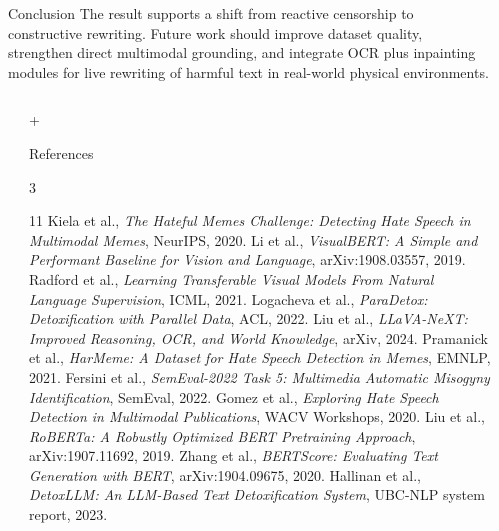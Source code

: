 \documentclass[final]{beamer}
\newlength{\sepwidth}
\newlength{\colwidth}
\newcommand{\separatorcolumn}{\begin{column}{\sepwidth}\end{column}}
\newcommand{\smallgap}{\vspace{0.18em}}
\begin{document}
\begin{frame}[t]
\begin{columns}[t]
\begin{column}{\colwidth}
\begin{block}{Conclusion}
    \smallgap
    The result supports a shift from reactive censorship to constructive
    rewriting. Future work should improve dataset quality, strengthen direct
    multimodal grounding, and integrate OCR plus inpainting modules for live
    rewriting of harmful text in real-world physical
    environments.
    \end{block}

\end{column}
\separatorcolumn

\end{columns}

\vspace{-0.2em}
\begin{columns}[t]
\separatorcolumn
\begin{column}{\colwidth+\sepwidth\relax}
    \begin{block}{References}
    \vspace{-0.7em}
    \begin{multicols}{3}
    \setlength{\columnsep}{3.0cm}
    \raggedcolumns
    \tiny{}
    \begin{thebibliography}{11}
        \setlength{\itemsep}{0pt}
        \setlength{\parskip}{0pt}
        \setlength{\parsep}{0pt}
         Kiela et al., \emph{The Hateful Memes Challenge: Detecting Hate Speech in Multimodal Memes}, NeurIPS, 2020.
         Li et al., \emph{VisualBERT: A Simple and Performant Baseline for Vision and Language}, arXiv:1908.03557, 2019.
         Radford et al., \emph{Learning Transferable Visual Models From Natural Language Supervision}, ICML, 2021.
         Logacheva et al., \emph{ParaDetox: Detoxification with Parallel Data}, ACL, 2022.
        \columnbreak
         Liu et al., \emph{LLaVA-NeXT: Improved Reasoning, OCR, and World Knowledge}, arXiv, 2024.
         Pramanick et al., \emph{HarMeme: A Dataset for Hate Speech Detection in Memes}, EMNLP, 2021.
         Fersini et al., \emph{SemEval-2022 Task 5: Multimedia Automatic Misogyny Identification}, SemEval, 2022.
         Gomez et al., \emph{Exploring Hate Speech Detection in Multimodal Publications}, WACV Workshops, 2020.
        \columnbreak
         Liu et al., \emph{RoBERTa: A Robustly Optimized BERT Pretraining Approach}, arXiv:1907.11692, 2019.
         Zhang et al., \emph{BERTScore: Evaluating Text Generation with BERT}, arXiv:1904.09675, 2020.
         Hallinan et al., \emph{DetoxLLM: An LLM-Based Text Detoxification System}, UBC-NLP system report, 2023.
    \end{thebibliography}
    \end{multicols}
    \vspace{-1.0em}
    \end{block}
\end{column}
\separatorcolumn
\end{columns}
\end{frame}
\end{document}
